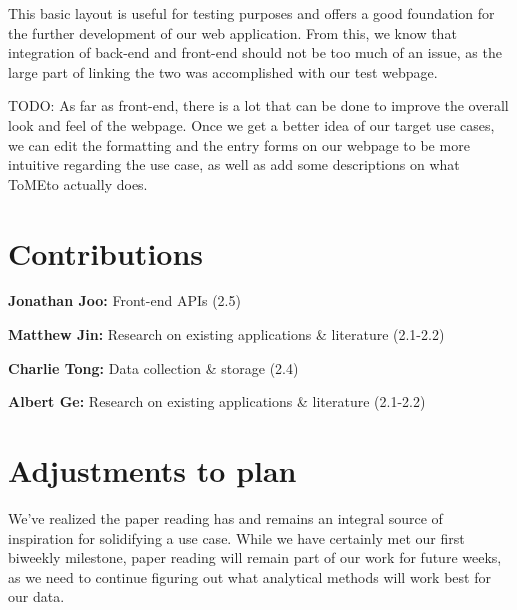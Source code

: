 \documentclass{article}
\begin{document}
This basic layout is useful for testing purposes and offers a good foundation for the further development of our web application. From this, we know that integration of back-end and front-end should not be too much of an issue, as the large part of linking the two was accomplished with our test webpage.

TODO: As far as front-end, there is a lot that can be done to improve the overall look and feel of the webpage. Once we get a better idea of our target use cases, we can edit the formatting and the entry forms on our webpage to be more intuitive regarding the use case, as well as add some descriptions on what ToMEto actually does.



\section{Contributions}
\textbf{Jonathan Joo:} Front-end APIs (2.5)

\textbf{Matthew Jin:} Research on existing applications \& literature (2.1-2.2)

\textbf{Charlie Tong:} Data collection \& storage (2.4)

\textbf{Albert Ge:} Research on existing applications \& literature (2.1-2.2)



\section{Adjustments to plan}
We've realized the paper reading has and remains an integral source of inspiration for solidifying a use case. While we have certainly met our first biweekly milestone, paper reading will remain part of our work for future weeks, as we need to continue figuring out what analytical methods will work best for our data. 
\end{document}
